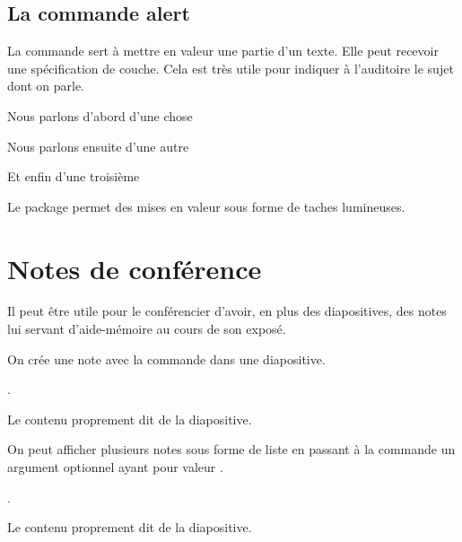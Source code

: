 \subsection{La commande alert}

La commande  sert à mettre en valeur une partie d'un texte. Elle peut recevoir une spécification de couche. Cela est très utile pour indiquer à l'auditoire le sujet dont on parle. 

\begin{latexcode}
\begin{frame}
\begin{description}
    \item\alert<1>{Nous parlons d'abord d'une chose}
    \item\alert<2>{Nous parlons ensuite d'une autre}
    \item\alert<3>{Et enfin d'une troisième}
\end{description}
\end{frame}
\end{latexcode}

\begin{plusloins}

Le package  permet des mises en valeur sous forme de taches lumineuses.

\end{plusloins}
\section{Notes de conférence}

Il peut être utile pour le conférencier d'avoir, en plus des diapositives, des notes  lui servant d'aide-mémoire au cours de son exposé.

On  crée une note avec la commande  dans une diapositive.

\begin{latexcode}
\begin{frame}
.
    
Le contenu proprement dit de la diapositive.
\end{frame}
\end{latexcode}

On peut afficher plusieurs notes sous forme de liste en passant  à la commande  un argument optionnel ayant pour valeur .

\begin{latexcode}
\begin{frame}
.
    
Le contenu proprement dit de la diapositive.
\end{frame}
\end{latexcode}


